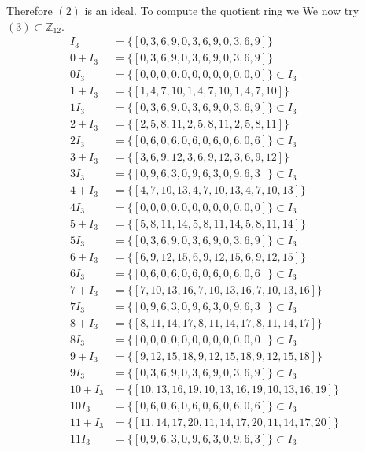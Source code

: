 \documentclass[11pt]{amsart}
\begin{document}
Therefore $(2)$ is an ideal.
To compute the quotient ring we
We now try $(3) \subset \mathbb{Z}_{12}$.
\begin{equation*}
\begin{aligned}
I_3 &= \{[0, 3, 6, 9, 0, 3, 6, 9, 0, 3, 6, 9]\} \\
0+ I_3 &= \{[0, 3, 6, 9, 0, 3, 6, 9, 0, 3, 6, 9]\}\\
0 I_3 &= \{[0, 0, 0, 0, 0, 0, 0, 0, 0, 0, 0, 0]\} \subset I_3 \\
1+ I_3 &= \{[1, 4, 7, 10, 1, 4, 7, 10, 1, 4, 7, 10]\}\\
1 I_3 &= \{[0, 3, 6, 9, 0, 3, 6, 9, 0, 3, 6, 9]\} \subset I_3 \\
2+ I_3 &= \{[2, 5, 8, 11, 2, 5, 8, 11, 2, 5, 8, 11]\}\\
2 I_3 &= \{[0, 6, 0, 6, 0, 6, 0, 6, 0, 6, 0, 6]\} \subset I_3 \\
3+ I_3 &= \{[3, 6, 9, 12, 3, 6, 9, 12, 3, 6, 9, 12]\}\\
3 I_3 &= \{[0, 9, 6, 3, 0, 9, 6, 3, 0, 9, 6, 3]\} \subset I_3 \\
4+ I_3 &= \{[4, 7, 10, 13, 4, 7, 10, 13, 4, 7, 10, 13]\}\\
4 I_3 &= \{[0, 0, 0, 0, 0, 0, 0, 0, 0, 0, 0, 0]\} \subset I_3 \\
5+ I_3 &= \{[5, 8, 11, 14, 5, 8, 11, 14, 5, 8, 11, 14]\}\\
5 I_3 &= \{[0, 3, 6, 9, 0, 3, 6, 9, 0, 3, 6, 9]\} \subset I_3 \\
6+ I_3 &= \{[6, 9, 12, 15, 6, 9, 12, 15, 6, 9, 12, 15]\}\\
6 I_3 &= \{[0, 6, 0, 6, 0, 6, 0, 6, 0, 6, 0, 6]\} \subset I_3 \\
7+ I_3 &= \{[7, 10, 13, 16, 7, 10, 13, 16, 7, 10, 13, 16]\}\\
7 I_3 &= \{[0, 9, 6, 3, 0, 9, 6, 3, 0, 9, 6, 3]\} \subset I_3 \\
8+ I_3 &= \{[8, 11, 14, 17, 8, 11, 14, 17, 8, 11, 14, 17]\}\\
8 I_3 &= \{[0, 0, 0, 0, 0, 0, 0, 0, 0, 0, 0, 0]\} \subset I_3 \\
9+ I_3 &= \{[9, 12, 15, 18, 9, 12, 15, 18, 9, 12, 15, 18]\}\\
9 I_3 &= \{[0, 3, 6, 9, 0, 3, 6, 9, 0, 3, 6, 9]\} \subset I_3 \\
10+ I_3 &= \{[10, 13, 16, 19, 10, 13, 16, 19, 10, 13, 16, 19]\}\\
10 I_3 &= \{[0, 6, 0, 6, 0, 6, 0, 6, 0, 6, 0, 6]\} \subset I_3 \\
11+ I_3 &= \{[11, 14, 17, 20, 11, 14, 17, 20, 11, 14, 17, 20]\}\\
11 I_3 &= \{[0, 9, 6, 3, 0, 9, 6, 3, 0, 9, 6, 3]\} \subset I_3 \\
\end{aligned}
\end{equation*}
\end{document}
